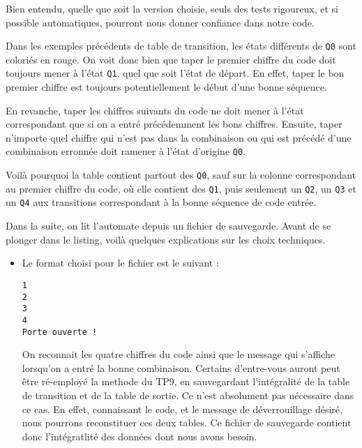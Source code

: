 \documentclass[10pt]{article}
\begin{document}
\begin{enumerate}[label=\textbf{[\alph*]}]
  Bien entendu, quelle que soit la version choisie, seuls des tests
  rigoureux, et si possible automatiques, pourront nous donner
  confiance dans notre code.

\item Dans les exemples précédents de table de transition, les états
  différents de \texttt{Q0} sont coloriés en rouge. On voit donc bien
  que taper le premier chiffre du code doit toujours mener à l'état
  \texttt{Q1}, quel que soit l'état de départ. En effet, taper le bon
  premier chiffre est toujours potentiellement le début d'une bonne
  séquence.
  \vspace{0.2cm}

  En revanche, taper les chiffres suivants du code ne doit mener à
  l'état correspondant que si on a entré précédemment les bons
  chiffres. Ensuite, taper n'importe quel chiffre qui n'est pas dans
  la combinaison ou qui est précédé d'une combinaison erronnée doit
  ramener à l'état d'origine \texttt{Q0}.
  \vspace{0.2cm}

  Voilà pourquoi la table contient partout des \texttt{Q0}, sauf sur
  la colonne correspondant au premier chiffre du code, où elle
  contient des \texttt{Q1}, puis seulement un \texttt{Q2}, un
  \texttt{Q3} et un \texttt{Q4} aux transitions correspondant à la
  bonne séquence de code entrée.
  \vspace{2cm}

  \newpage

\item Dans la suite, on lit l'automate depuis un fichier de
  sauvegarde. Avant de se plonger dans le listing, voilà quelques
  explications sur les choix techniques.

  \begin{itemize}
  \item Le format choisi pour le fichier est le suivant :
\begin{verbatim}
1
2
3
4
Porte ouverte !
\end{verbatim}
    On reconnait les quatre chiffres du code ainsi que le message qui
    s'affiche lorsqu'on a entré la bonne combinaison. Certains
    d'entre-vous auront peut être ré-employé la methode du TP9, en
    sauvegardant l'intégralité de la table de transition et de la
    table de sortie. Ce n'est absolument pas nécessaire dans ce
    cas. En effet, connaissant le code, et le message de
    déverrouillage désiré, nous pourrons reconstituer ces deux
    tables. Ce fichier de sauvegarde contient donc l'intégratlité des
    données dont nous avons besoin.


\end{itemize}
\end{enumerate}
\end{document}
